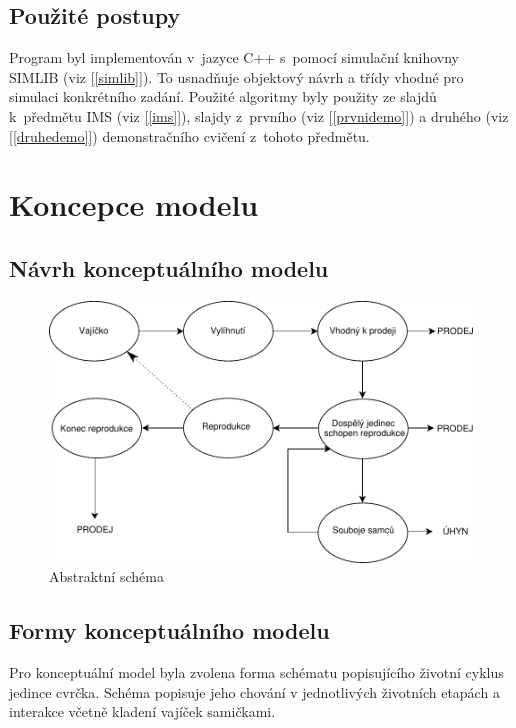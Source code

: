 \documentclass[11pt, a4paper, titlepage]{article}
\begin{document}
    \subsection{Použité postupy}
    Program byl implementován v~jazyce C++ s~pomocí simulační knihovny SIMLIB (viz [\ref{simlib}]). To usnadňuje objektový návrh
    a třídy vhodné pro simulaci konkrétního zadání. Použité algoritmy byly použity ze slajdů k~předmětu IMS (viz [\ref{ims}]), slajdy
    z~prvního (viz [\ref{prvnidemo}]) a druhého (viz [\ref{druhedemo}]) demonstračního cvičení z~tohoto předmětu.

    \section{Koncepce modelu}

    \subsection{Návrh konceptuálního modelu}

    \begin{figure}[H]
        \begin{center}
            \includegraphics[width=.8\textwidth]{./assets/abstraktni_model.pdf}
            \caption{Abstraktní schéma}
        \end{center}
    \end{figure}

    \subsection{Formy konceptuálního modelu}

    Pro konceptuální model byla zvolena forma schématu popisujícího životní cyklus jedince cvrčka. Schéma popisuje jeho
    chování v jednotlivých životních etapách a interakce včetně kladení vajíček samičkami.
\end{document}
